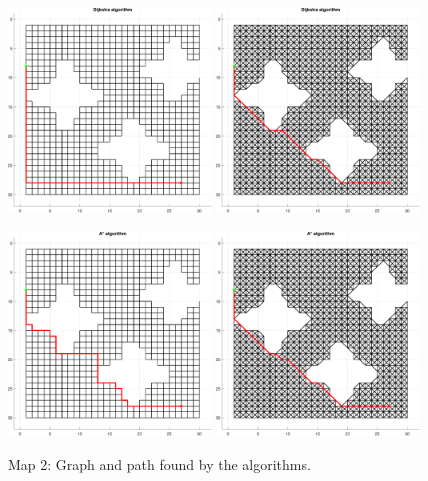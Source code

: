 \begin{figure}[H]
    \centering
    \includegraphics[width=0.48\textwidth]{./img/MATLAB/02_dijkstra_orthogonal.pdf}
    \hspace{6pt}
    \includegraphics[width=0.48\textwidth]{./img/MATLAB/02_dijkstra_diagonal.pdf}

    \vspace{11pt}

    \includegraphics[width=0.48\textwidth]{./img/MATLAB/02_astar_orthogonal.pdf}
    \hspace{6pt}
    \includegraphics[width=0.48\textwidth]{./img/MATLAB/02_astar_diagonal.pdf}
    \caption{Map 2: Graph and path found by the algorithms.}
    \label{fig:map_2_results}
\end{figure}


